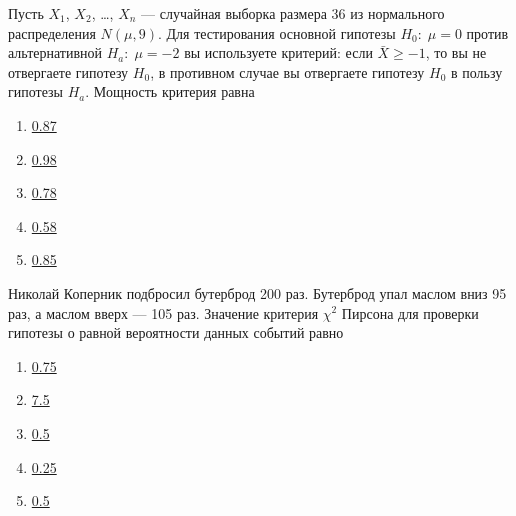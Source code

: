 \documentclass[t]{beamer}
\begin{document}
 \begin{frame} \label{45} 
\begin{block}{45} 

Пусть $X_1$, $X_2$, \ldots, $X_n$ — случайная выборка размера 36 из нормального распределения $N(\mu, 9)$. Для тестирования основной гипотезы  $H_0: \; \mu=0$  против альтернативной $H_a: \; \mu=-2$   вы используете критерий: если  $\bar{X}\geq -1$, то вы не отвергаете гипотезу $H_0$, в противном случае вы отвергаете гипотезу  $H_0$ в пользу гипотезы  $H_a$. Мощность критерия равна
 


 \end{block} 
\begin{enumerate} 
\item[] \hyperlink{45-No}{\beamergotobutton{} 0.87}
\item[] \hyperlink{45-Yes}{\beamergotobutton{} 0.98}
\item[] \hyperlink{45-No}{\beamergotobutton{} 0.78}
\item[] \hyperlink{45-No}{\beamergotobutton{} 0.58}
\item[] \hyperlink{45-No}{\beamergotobutton{} 0.85}
\end{enumerate} 
\end{frame} 


 \begin{frame} \label{46} 
\begin{block}{46} 

Николай Коперник подбросил бутерброд 200 раз. Бутерброд упал маслом вниз 95 раз, а маслом вверх — 105 раз. Значение критерия $\chi^2$ Пирсона для проверки гипотезы о равной вероятности данных событий равно
 


 \end{block} 
\begin{enumerate} 
\item[] \hyperlink{46-No}{\beamergotobutton{} 0.75}
\item[] \hyperlink{46-No}{\beamergotobutton{} 7.5}
\item[] \hyperlink{46-No}{\beamergotobutton{} 0.5}
\item[] \hyperlink{46-No}{\beamergotobutton{} 0.25}
\item[] \hyperlink{46-Yes}{\beamergotobutton{} 0.5}
\end{enumerate} 
\end{frame} 
\end{document}
